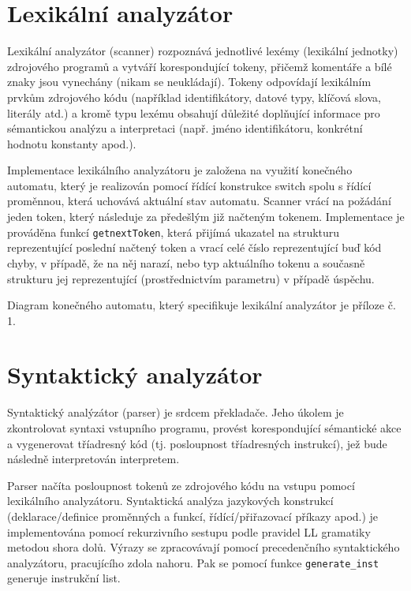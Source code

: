 \documentclass[12pt,a4paper,titlepage,final]{report}
\begin{document}
\section{Lexikální analyzátor}
Lexikální analyzátor (scanner) rozpoznává jednotlivé lexémy (lexikální jednotky) zdrojového programů a vytváří korespondující tokeny, přičemž komentáře a bílé znaky jsou vynechány (nikam se neukládají). Tokeny odpovídají lexikálním prvkům zdrojového kódu (například identifikátory, datové typy, klíčová slova, literály atd.) a kromě typu lexému obsahují důležité doplňující informace pro sémantickou analýzu a interpretaci (např. jméno identifikátoru, konkrétní hodnotu konstanty apod.).

Implementace lexikálního analyzátoru je založena na využití konečného automatu, který je realizován pomocí řídící konstrukce switch spolu s řídící proměnnou, která uchovává aktuální stav automatu. Scanner vrácí na požádání jeden token, který následuje za předešlým již načteným tokenem. Implementace je prováděna funkcí \texttt{getnextToken}, která přijímá ukazatel na strukturu reprezentující poslední načtený token a vrací celé číslo reprezentující buď kód chyby, v případě, že na něj narazí, nebo typ aktuálního tokenu a současně strukturu jej reprezentující (prostřednictvím parametru) v případě úspěchu.

Diagram konečného automatu, který specifikuje lexikální analyzátor je příloze č. 1.

\section{Syntaktický analyzátor}
Syntaktický analýzátor (parser) je srdcem překladače. Jeho úkolem je zkontrolovat syntaxi vstupního programu, provést korespondující sémantické akce a vygenerovat tříadresný kód (tj. posloupnost tříadresných instrukcí), jež bude následně interpretován interpretem.

Parser načíta posloupnost tokenů ze zdrojového kódu na vstupu pomocí lexikálního analyzátoru. Syntaktická analýza jazykových konstrukcí (deklarace/definice proměnných a funkcí, řídící/přiřazovací příkazy apod.) je implementována pomocí rekurzivního sestupu podle pravidel LL gramatiky metodou shora dolů. Výrazy se zpracovávají pomocí precedenčního syntaktického analyzátoru, pracujícího zdola nahoru. Pak se pomocí funkce \texttt{generate\_inst} generuje instrukční list.
\end{document}
